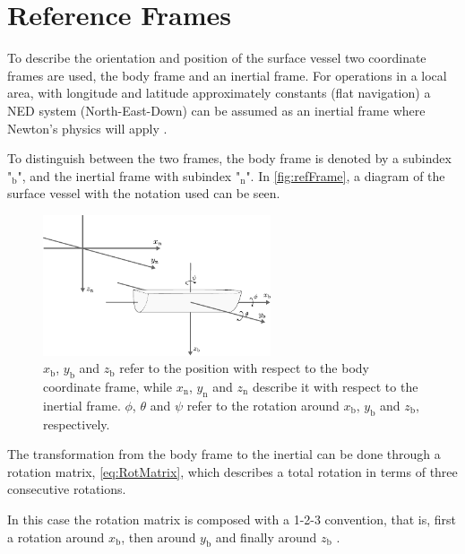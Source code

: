 \section{Reference Frames}
To describe the orientation and position of the surface vessel two coordinate frames are used, the body frame and an inertial frame. For operations in a local area, with longitude and latitude approximately constants (flat navigation) a NED system (North-East-Down) can be assumed as an inertial frame where Newton's physics will apply \cite[p. 17]{TFossen}.

To distinguish between the two frames, the body frame is denoted by a subindex "$_\mathrm{b}$", and the inertial frame with subindex "$_\mathrm{n}$". In \autoref{fig:refFrame}, a diagram of the surface vessel with the notation used can be seen.

\begin{figure}[H]
    \includegraphics[width=0.6\textwidth]{figures/boat3D}
    \caption{$x_\mathrm{b}$, $y_\mathrm{b}$ and $z_\mathrm{b}$ refer to the position with respect to the body coordinate frame, while $x_\mathrm{n}$, $y_\mathrm{n}$ and $z_\mathrm{n}$ describe it with respect to the inertial frame. $\phi$, $\theta$ and $\psi$ refer to the rotation around $x_\mathrm{b}$, $y_\mathrm{b}$ and $z_\mathrm{b}$, respectively.}
    \label{fig:refFrame}
\end{figure}


The transformation from the body frame to the inertial can be done through a rotation matrix, \eqref{eq:RotMatrix}, which describes a total rotation in terms of three consecutive rotations.

In this case the rotation matrix is composed with a 1-2-3 convention, that is, first a rotation around $x_{\mathrm{b}}$, then around $y_{\mathrm{b}}$ and finally around $z_{\mathrm{b}}$ \cite[p. 22]{TFossen}.

